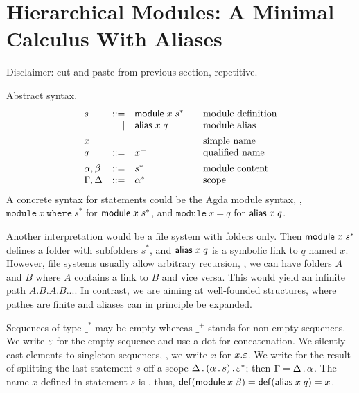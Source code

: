 \documentclass{article}
\theoremstyle{definition}
\theoremstyle{plain}
\theoremstyle{remark}
\begin{document}
\section{Hierarchical Modules: A Minimal Calculus With Aliases}

Disclaimer: cut-and-paste from previous section, repetitive.

Abstract syntax.
\[
\begin{array}{lrl@{\qquad}l}
  s & ::=  & \mdef x {s^*}    & \mbox{module definition} \\
    & \mid & \malias x q      & \mbox{module alias}  \\[1ex]
  x &  &                      & \mbox{simple name}       \\
  q & ::=  & x^+              & \mbox{qualified name}    \\[1ex]
  \alpha,\beta  & ::= & s^*   & \mbox{module content}    \\
  \Gamma,\Delta & ::= & \Ga^* & \mbox{scope}             \\
\end{array}
\]
A concrete syntax for statements could be the Agda module syntax, \ie,
$\texttt{module}~x~\texttt{where}~s^*$ for $\mathsf{module}\;x\;s^*$, and
$\texttt{module}~x~\texttt{=}~q$ for $\mathsf{alias}\;x\;q$.

Another interpretation would be a file system with folders only.  Then
$\mathsf{module}\;x\;s^*$ defines a folder with subfolders $s^*$, and $\mathsf{alias}\;x\;q$ is a symbolic link to $q$ named $x$.  However, file systems usually
allow arbitrary recursion, \eg, we can have folders $A$ and $B$ where
$A$ contains a link to $B$ and vice versa.  This would yield an
infinite path $A.B.A.B...$. In contrast, we are aiming
at well-founded structures, where pathes are finite and
aliases can in principle be expanded.

Sequences of type $\_^*$ may be empty whereas $\_^+$ stands for
non-empty sequences.
We write $\varepsilon$ for the empty sequence and use a dot %
for concatenation.
We silently cast elements to singleton sequences, \eg,
we write $x$ for $x.\varepsilon$.
We write  for the result of splitting the last
statement $s$ off a scope $\Delta \,.\, (\alpha \,.\, s) \,.\, \varepsilon^*$;
then $\Gamma = \Delta \,.\, \alpha$.
The name $x$ defined in statement $s$ is , thus,
$\mathop{\mathsf{def}}(\mathsf{module}\;x\;\beta) = \mathop{\mathsf{def}}(\mathsf{alias}\;x\;q) = x$.
\end{document}

